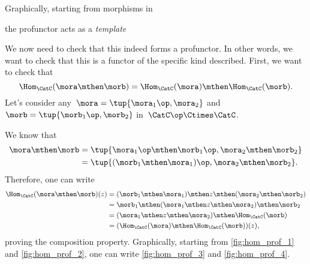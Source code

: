 %
Graphically, starting from morphisms in \CatC
\begin{center}
\end{center}
the profunctor acts as a \emph{template}
\begin{center}
\end{center}


We now need to check that this indeed forms a profunctor.
In other words, we want to check that this is a functor of the specific kind described.
First, we want to check that
%
\begin{equation}
    \label{eq:hom5}
    \Hom_\CatC(\mora \mthen \morb)=\Hom_\CatC(\mora)\mthen \Hom_\CatC(\morb).
\end{equation}
Let's consider any~$\mora=\tup{\mora_1\op, \mora_2}$ and~$\morb=\tup{\morb_1\op,\morb_2}$ in~$\CatC\op \Ctimes \CatC$.

We know that
\begin{equation}
    \label{eq:hom6}
    \begin{aligned}
        \mora\mthen \morb & =\tup{\mora_1\op \mthen \morb_1\op, \mora_2\mthen \morb_2} \\
                          & =\tup{(\morb_1\mthen \mora_1)\op, \mora_2\mthen \morb_2}.
    \end{aligned}
\end{equation}
Therefore, one can write
\begin{equation}
    \label{eq:hom7}
    \begin{aligned}
        \Hom_\CatC(\mora \mthen \morb)(z) & =(\morb_1\mthen \mora_1)\mthen z \mthen (\mora_2\mthen \morb_2) \\
                                          & =\morb_1\mthen (\mora_1\mthen z \mthen \mora_2) \mthen \morb_2 \\
                                          & =(\mora_1\mthen z \mthen \mora_2)\mthen \Hom_\CatC(\morb) \\
                                          & =(\Hom_\CatC(\mora)\mthen \Hom_\CatC(\morb))(z),
    \end{aligned}
\end{equation}
proving the composition property.
Graphically, starting from \cref{fig:hom_prof_1} and \cref{fig:hom_prof_2}, one can write \cref{fig:hom_prof_3} and \cref{fig:hom_prof_4}.


